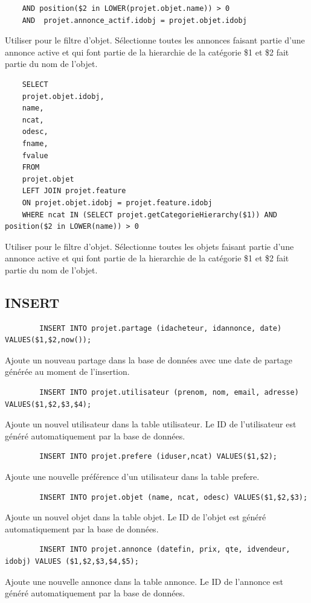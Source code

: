 \documentclass[a4paper,12pt]{article}
\begin{document}
\begin{spacing}{1}
\begin{verbatim}
	AND position($2 in LOWER(projet.objet.name)) > 0 
	AND  projet.annonce_actif.idobj = projet.objet.idobj
	\end{verbatim}
	Utiliser pour le filtre d'objet. Sélectionne toutes les annonces faisant partie d'une annonce active et qui font partie de la hierarchie de la catégorie \$1 et \$2 fait partie du nom de l'objet.
	\begin{verbatim}
	SELECT 
	projet.objet.idobj,
	name,
	ncat,
	odesc,
	fname,
	fvalue 
	FROM 
	projet.objet 
	LEFT JOIN projet.feature 
	ON projet.objet.idobj = projet.feature.idobj 
	WHERE ncat IN (SELECT projet.getCategorieHierarchy($1)) AND position($2 in LOWER(name)) > 0		
	\end{verbatim}
	Utiliser pour le filtre d'objet. Sélectionne toutes les objets faisant partie d'une annonce active et qui font partie de la hierarchie de la catégorie \$1 et \$2 fait partie du nom de l'objet.
    \subsection*{INSERT}
    
    \begin{verbatim}
        INSERT INTO projet.partage (idacheteur, idannonce, date) VALUES($1,$2,now());
    \end{verbatim}
    Ajoute un nouveau partage dans la base de données avec une date de partage générée au moment de l'insertion.
    
    \begin{verbatim}
        INSERT INTO projet.utilisateur (prenom, nom, email, adresse) VALUES($1,$2,$3,$4);
    \end{verbatim}
    Ajoute un nouvel utilisateur dans la table utilisateur. Le ID de l'utilisateur est généré automatiquement par la base de données. 

    \begin{verbatim}
        INSERT INTO projet.prefere (iduser,ncat) VALUES($1,$2);
    \end{verbatim}
    Ajoute une nouvelle préférence d'un utilisateur dans la table prefere.
    
    \begin{verbatim}
        INSERT INTO projet.objet (name, ncat, odesc) VALUES($1,$2,$3);
    \end{verbatim}
    Ajoute un nouvel objet dans la table objet. Le ID de l'objet est généré automatiquement par la base de données.
    
    \begin{verbatim}
        INSERT INTO projet.annonce (datefin, prix, qte, idvendeur, idobj) VALUES ($1,$2,$3,$4,$5);
    \end{verbatim}
    Ajoute une nouvelle annonce dans la table annonce. Le ID de l'annonce est généré automatiquement par la base de données.


\end{spacing}
\end{document}
